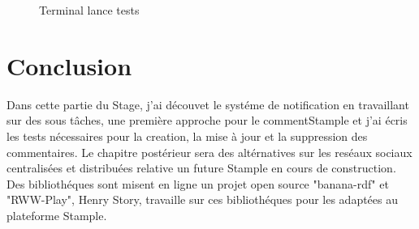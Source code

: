\documentclass[12pt,oneside,a4paper]{article}
\begin{document}
\begin{figure}[H]
\begin{minipage}[c]{.5\linewidth}
\begin{center}
\caption{Terminal lance tests}
\label{fig:Terminal lance tests}
\end{center}
\end{minipage}
\end{figure}

\section{Conclusion}
Dans cette partie du Stage, j'ai découvet le systéme de notification en travaillant sur des sous tâches, une première approche pour le commentStample et j'ai écris les tests nécessaires pour la creation, la mise à jour et la suppression des commentaires.
Le chapitre postérieur sera des altérnatives sur les reséaux sociaux centralisées et distribuées relative un future Stample en cours de construction.
Des bibliothéques sont misent en ligne un projet open source "banana-rdf" et "RWW-Play", Henry Story, travaille sur ces bibliothéques pour les adaptées au plateforme Stample.


  
\end{document}

